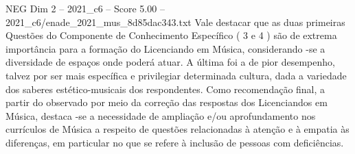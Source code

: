 \begin{textsample}{NEG Dim 2 – 2021\_c6 – Score 5.00 – 2021\_c6/enade\_2021\_mus\_8d85dac343.txt}
Vale destacar que as duas primeiras Questões do Componente de Conhecimento Específico ( 3 e 4 ) são de extrema importância para a formação do Licenciando em Música, considerando -se a diversidade de espaços onde poderá atuar.
A última foi a de pior desempenho, talvez por ser mais específica e privilegiar determinada cultura, dada a variedade dos saberes estético-musicais dos respondentes.
Como recomendação final, a partir do observado por meio da correção das respostas dos Licenciandos em Música, destaca -se a necessidade de ampliação e/ou aprofundamento nos currículos de Música a respeito de questões relacionadas à atenção e à empatia às diferenças, em particular no que se refere à inclusão de pessoas com deficiências.

\end{textsample}
